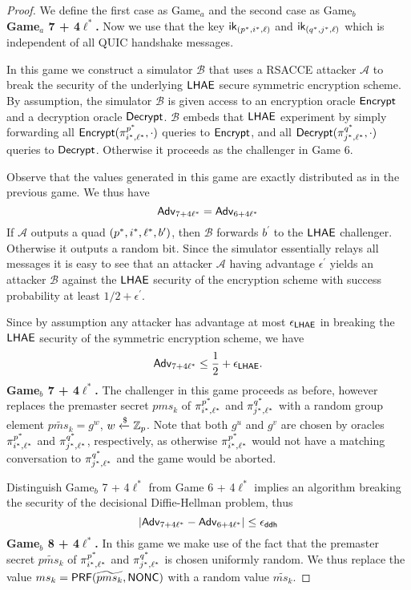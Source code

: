 \begin{proof}
 We define the first case as Game$_{a}$ and the second case as Game$_{b}$
\vspace{10pt}\\%
%
%
 \textbf{Game$_a$ 7 + 4$\ell^{\ast}$.} Now we use that the key $\mathsf{ik}_{(p^{\ast}, i^{\ast}, \ell)}$ and $\mathsf{ik}_{(q^{\ast}, j^{\ast}, \ell)}$ which is independent of all QUIC handshake messages.

 In this game we construct a simulator $\mathcal{B}$ that uses a RSACCE attacker $\mathcal{A}$ to break the security of the underlying $\mathsf{LHAE}$ secure symmetric encryption scheme. By assumption, the simulator $\mathcal{B}$ is given access to an encryption oracle $\mathsf{Encrypt}$ and a decryption oracle $\mathsf{Decrypt}$. $\mathcal{B}$ embeds that $\mathsf{LHAE}$ experiment by simply forwarding all $\mathsf{Encrypt}(\pi^{p^{\ast}}_{i^{\ast},\ell^{\ast}},\cdot)$ queries to $\mathsf{Encrypt}$, and all $\mathsf{Decrypt}(\pi^{q^{\ast}}_{j^{\ast},\ell^{\ast}},\cdot)$ queries to $\mathsf{Decrypt}$. Otherwise it proceeds as the challenger in Game 6.

 Observe that the values generated in this game are exactly distributed as in the previous game. We thus have
 \begin{equation}
  \mathsf{Adv}_{7 + 4\ell^{\ast}} = \mathsf{Adv}_{6 + 4\ell^{\ast}}
 \end{equation}%
 If $\mathcal{A}$ outputs a quad $(p^{\ast}, i^{\ast}, \ell^{\ast}, b^{\prime})$, then $\mathcal{B}$ forwards $b^{\prime}$ to the $\mathsf{LHAE}$ challenger. Otherwise it outputs a random bit. Since the simulator essentially relays all messages it is easy to see that an attacker $\mathcal{A}$ having advantage $\epsilon^{\prime}$ yields an attacker $\mathcal{B}$ against the $\mathsf{LHAE}$ security of the encryption scheme with success probability at least $1/2 + \epsilon^{\prime}$.

 Since by assumption any attacker has advantage at most $\epsilon_{\mathsf{LHAE}}$ in breaking the $\mathsf{LHAE}$ security of the symmetric encryption scheme, we have
 \begin{equation}
  \mathsf{Adv}_{7 + 4\ell^{\ast}} \leq \frac{1}{2} + \epsilon_{\mathsf{LHAE}}.
 \end{equation}%
%
%
 \textbf{Game$_b$ 7 + 4$\ell^{\ast}$.} The challenger in this game proceeds as before, however replaces the premaster secret $pms_{k}$ of $\pi^{p^{\ast}}_{i^{\ast},\ell^{\ast}}$ and $\pi^{q^{\ast}}_{j^{\ast},\ell^{\ast}}$ with a random group element $\widetilde{pms_{k}} = g^w$, $w \xleftarrow{\$} \mathbb{Z}_p$. Note that both $g^u$ and $g^v$ are chosen by oracles $\pi^{p^{\ast}}_{i^{\ast},\ell^{\ast}}$ and $\pi^{q^{\ast}}_{j^{\ast},\ell^{\ast}}$, respectively, as otherwise $\pi^{p^{\ast}}_{i^{\ast},\ell^{\ast}}$ would not have a matching conversation to $\pi^{q^{\ast}}_{j^{\ast},\ell^{\ast}}$ and the game would be aborted.

 Distinguish Game$_b$ 7 + 4$\ell^{\ast}$ from Game 6 + 4$\ell^{\ast}$ implies an algorithm breaking the security of the decisional Diffie-Hellman problem, thus
 \begin{equation}
  |\mathsf{Adv}_{7 + 4\ell^{\ast}} - \mathsf{Adv}_{6 + 4\ell^{\ast}}| \leq \epsilon_{\mathsf{ddh}}
 \end{equation}%
%
%
 \textbf{Game$_b$ 8 + 4$\ell^{\ast}$.} In this game we make use of the fact that the premaster secret $\widetilde{pms_{k}}$ of $\pi^{p^{\ast}}_{i^{\ast},\ell^{\ast}}$ and $\pi^{q^{\ast}}_{j^{\ast},\ell^{\ast}}$ is chosen uniformly random. We thus replace the value $ms_{k} = \mathsf{PRF}(\widetilde{pms_{k}}, \mathsf{NONC})$ with a random value $\widetilde{ms_{k}}$.


\end{proof}
